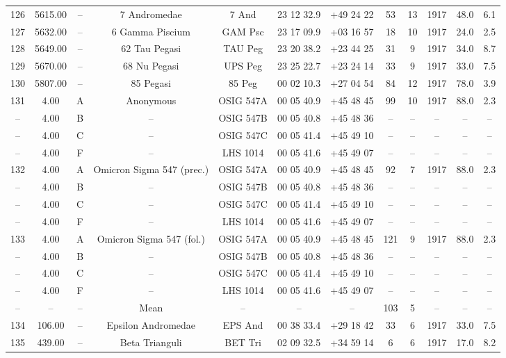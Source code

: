 \begin{table}
\begin{tabular}{cccccccccccc}
126 & 5615.00 & -- & 7 Andromedae & 7 And & 23 12 32.9 & +49 24 22 & 53 & 13 & 1917 & 48.0 & 6.1 \\
127 & 5632.00 & -- & 6 Gamma Piscium & GAM Psc & 23 17 09.9 & +03 16 57 & 18 & 10 & 1917 & 24.0 & 2.5 \\
128 & 5649.00 & -- & 62 Tau Pegasi & TAU Peg & 23 20 38.2 & +23 44 25 & 31 & 9 & 1917 & 34.0 & 8.7 \\
129 & 5670.00 & -- & 68 Nu Pegasi & UPS Peg & 23 25 22.7 & +23 24 14 & 33 & 9 & 1917 & 33.0 & 7.5 \\
130 & 5807.00 & -- & 85 Pegasi & 85 Peg & 00 02 10.3 & +27 04 54 & 84 & 12 & 1917 & 78.0 & 3.9 \\
131 & 4.00 & A & Anonymous & OSIG  547A & 00 05 40.9 & +45 48 45 & 99 & 10 & 1917 & 88.0 & 2.3 \\
-- & 4.00 & B & -- & OSIG  547B & 00 05 40.8 & +45 48 36 & -- & -- & -- & -- & -- \\
-- & 4.00 & C & -- & OSIG  547C & 00 05 41.4 & +45 49 10 & -- & -- & -- & -- & -- \\
-- & 4.00 & F & -- & LHS 1014 & 00 05 41.6 & +45 49 07 & -- & -- & -- & -- & -- \\
132 & 4.00 & A & Omicron Sigma 547 (prec.) & OSIG  547A & 00 05 40.9 & +45 48 45 & 92 & 7 & 1917 & 88.0 & 2.3 \\
-- & 4.00 & B & -- & OSIG  547B & 00 05 40.8 & +45 48 36 & -- & -- & -- & -- & -- \\
-- & 4.00 & C & -- & OSIG  547C & 00 05 41.4 & +45 49 10 & -- & -- & -- & -- & -- \\
-- & 4.00 & F & -- & LHS 1014 & 00 05 41.6 & +45 49 07 & -- & -- & -- & -- & -- \\
133 & 4.00 & A & Omicron Sigma 547 (fol.) & OSIG  547A & 00 05 40.9 & +45 48 45 & 121 & 9 & 1917 & 88.0 & 2.3 \\
-- & 4.00 & B & -- & OSIG  547B & 00 05 40.8 & +45 48 36 & -- & -- & -- & -- & -- \\
-- & 4.00 & C & -- & OSIG  547C & 00 05 41.4 & +45 49 10 & -- & -- & -- & -- & -- \\
-- & 4.00 & F & -- & LHS 1014 & 00 05 41.6 & +45 49 07 & -- & -- & -- & -- & -- \\
-- & -- & -- & Mean & -- & -- & -- & 103 & 5 & -- & -- & -- \\
134 & 106.00 & -- & Epsilon Andromedae & EPS And & 00 38 33.4 & +29 18 42 & 33 & 6 & 1917 & 33.0 & 7.5 \\
135 & 439.00 & -- & Beta Trianguli & BET Tri & 02 09 32.5 & +34 59 14 & 6 & 6 & 1917 & 17.0 & 8.2 \\

\end{tabular}
\end{table}
